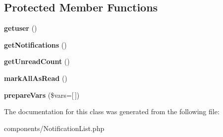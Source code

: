 \subsection*{Protected Member Functions}
\begin{DoxyCompactItemize}
\item 
\hypertarget{classDMA_1_1Friends_1_1Components_1_1NotificationList_a074dd7aca870f19ec427cd5a5d7ac251}{{\bfseries getuser} ()}\label{classDMA_1_1Friends_1_1Components_1_1NotificationList_a074dd7aca870f19ec427cd5a5d7ac251}

\item 
\hypertarget{classDMA_1_1Friends_1_1Components_1_1NotificationList_adc479f44c9f83683592e2b9bbfc8d814}{{\bfseries get\+Notifications} ()}\label{classDMA_1_1Friends_1_1Components_1_1NotificationList_adc479f44c9f83683592e2b9bbfc8d814}

\item 
\hypertarget{classDMA_1_1Friends_1_1Components_1_1NotificationList_adbda745fafdd386aec038c6f9e4d5147}{{\bfseries get\+Unread\+Count} ()}\label{classDMA_1_1Friends_1_1Components_1_1NotificationList_adbda745fafdd386aec038c6f9e4d5147}

\item 
\hypertarget{classDMA_1_1Friends_1_1Components_1_1NotificationList_a5eef82282d782ab43559e31143472542}{{\bfseries mark\+All\+As\+Read} ()}\label{classDMA_1_1Friends_1_1Components_1_1NotificationList_a5eef82282d782ab43559e31143472542}

\item 
\hypertarget{classDMA_1_1Friends_1_1Components_1_1NotificationList_a2e4271c838bd10f2790ae7ac1cb83638}{{\bfseries prepare\+Vars} (\$vars=\mbox{[}$\,$\mbox{]})}\label{classDMA_1_1Friends_1_1Components_1_1NotificationList_a2e4271c838bd10f2790ae7ac1cb83638}

\end{DoxyCompactItemize}


The documentation for this class was generated from the following file\+:\begin{DoxyCompactItemize}
\item 
components/Notification\+List.\+php\end{DoxyCompactItemize}
